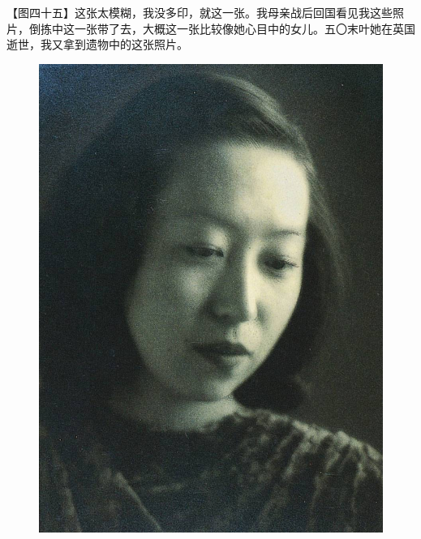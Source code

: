\clearpage
\par 【图四十五】这张太模糊，我没多印，就这一张。我母亲战后回国看见我这些照片，倒拣中这一张带了去，大概这一张比较像她心目中的女儿。五〇末叶她在英国逝世，我又拿到遗物中的这张照片。
\begin{figure}[htb]
    \centering %
    \includegraphics[scale=0.4]{picture/对照记45.jpeg}
\end{figure}


